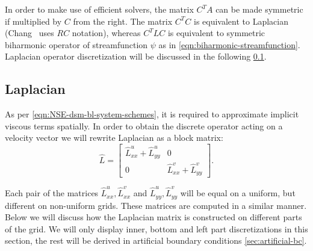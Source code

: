 \documentclass{article}
\numberwithin{equation}{section}
\begin{document}
In order to make use of efficient solvers, the matrix $C^TA$ can be made symmetric if multiplied by $C$ from the right. The matrix $C^TC$ is equivalent to Laplacian (Chang~\cite{Chang:2002} uses $RC$ notation), whereas $C^TLC$ is equivalent to symmetric biharmonic operator of streamfunction $\psi$ as in \cref{eqn:biharmonic-streamfunction}. Laplacian operator discretization will be discussed in the following \cref{sec:laplacian}.



\subsection{Laplacian}\label{sec:laplacian}
As per \cref{eqn:NSE-dsm-bl-system-schemes}, it is required to approximate implicit viscous terms spatially. In order to obtain the discrete operator acting on a velocity vector we will rewrite Laplacian as a block matrix:
\begin{equation*}
	\hat L=
	\begin{bmatrix}
  \hat{L}^u_{xx}+\hat{L}^u_{yy} & 0 \\
  0 & \hat{L}^v_{xx}+\hat{L}^v_{yy}
\end{bmatrix}.
\end{equation*}

Each pair of the matrices $\hat{L}^u_{xx},\hat{L}^v_{xx}$ and $\hat{L}^u_{yy},\hat{L}^v_{yy}$ will be equal on a uniform, but different on non-uniform grids. These matrices are computed in a similar manner. Below we will discuss how the Laplacian matrix is constructed on different parts of the grid. We will only display inner, bottom and left part discretizations in this section, the rest will be derived in artificial boundary conditions \cref{sec:artificial-bc}.
\end{document}
